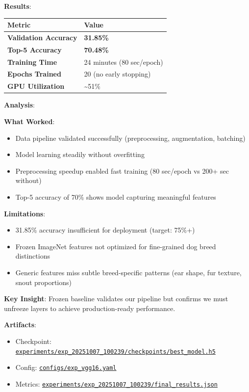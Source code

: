 \documentclass[
  letterpaper,
  DIV=11,
  numbers=noendperiod]{scrartcl}
\providecommand{\tightlist}{%
  \setlength{\itemsep}{0pt}\setlength{\parskip}{0pt}}
\begin{document}
\textbf{Results}:

\begin{longtable}[]{@{}ll@{}}
\toprule\noalign{}
Metric & Value \\
\midrule\noalign{}
\endhead
\bottomrule\noalign{}
\endlastfoot
\textbf{Validation Accuracy} & \textbf{31.85\%} \\
\textbf{Top-5 Accuracy} & \textbf{70.48\%} \\
\textbf{Training Time} & 24 minutes (80 sec/epoch) \\
\textbf{Epochs Trained} & 20 (no early stopping) \\
\textbf{GPU Utilization} & \textasciitilde51\% \\
\end{longtable}

\textbf{Analysis}:

\textbf{What Worked}:

\begin{itemize}
\tightlist
\item
  Data pipeline validated successfully (preprocessing, augmentation,
  batching)
\item
  Model learning steadily without overfitting
\item
  Preprocessing speedup enabled fast training (80 sec/epoch vs 200+ sec
  without)
\item
  Top-5 accuracy of 70\% shows model capturing meaningful features
\end{itemize}

\textbf{Limitations}:

\begin{itemize}
\tightlist
\item
  31.85\% accuracy insufficient for deployment (target: 75\%+)
\item
  Frozen ImageNet features not optimized for fine-grained dog breed
  distinctions
\item
  Generic features miss subtle breed-specific patterns (ear shape, fur
  texture, snout proportions)
\end{itemize}

\textbf{Key Insight}: Frozen baseline validates our pipeline but
confirms we must unfreeze layers to achieve production-ready
performance.

\textbf{Artifacts}:

\begin{itemize}
\tightlist
\item
  Checkpoint:
  \href{../experiments/exp_20251007_100239/checkpoints/best_model.h5}{\texttt{experiments/exp\_20251007\_100239/checkpoints/best\_model.h5}}
\item
  Config:
  \href{../configs/exp_vgg16.yaml}{\texttt{configs/exp\_vgg16.yaml}}
\item
  Metrics:
  \href{../experiments/exp_20251007_100239/final_results.json}{\texttt{experiments/exp\_20251007\_100239/final\_results.json}}
\end{itemize}
\end{document}
